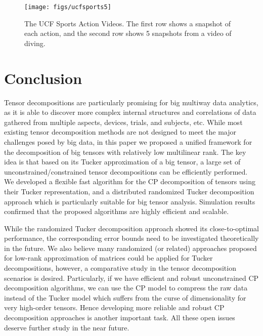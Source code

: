 \documentclass[10pt,twocolumn,twoside]{IEEEtran}
\begin{document}
 \begin{figure}[!t]
\centerline{
    \texttt{[image: figs/ucfsports5]}
}
\caption{The UCF Sports Action Videos. The first row shows a snapshot of each action, and the second row shows 5 snapshots from a video of diving.}
\label{fig:UCFSports}
\end{figure}


\section{Conclusion}
\label{sec:conclusion}
Tensor decompositions are particularly promising for big multiway data analytics, as it is able to discover more complex internal structures and correlations of data gathered from multiple aspects, devices, trials, and subjects, etc. While most existing tensor decomposition methods are not designed to meet the major challenges posed by big data, in this paper we proposed a unified framework for the decomposition of big tensors with relatively low multilinear rank. The key idea is that based on its Tucker approximation of a big tensor, a large set of unconstrained/constrained tensor decompositions can be efficiently performed. We developed a flexible fast algorithm for the CP decomposition of tensors using their Tucker representation, and a distributed randomized Tucker decomposition approach which is particularly suitable for big tensor analysis. Simulation results confirmed that the proposed algorithms are highly efficient and scalable. 

While the randomized Tucker decomposition approach showed its close-to-optimal performance, the corresponding error bounds need to be investigated theoretically in the future. We also believe many randomized (or related) approaches proposed for low-rank approximation of matrices \cite{siam_probLowRank,LRApIEEE} could be applied for Tucker decompositions, however, a comparative study in the tensor decomposition scenarios is desired. Particularly, if we have efficient and robust unconstrained CP decomposition algorithms, we can use the CP model to compress the raw data instead of the Tucker model which suffers from the curse of dimensionality for very high-order tensors. Hence developing more reliable and robust CP decomposition approaches is another important task. All these open issues deserve further study in the near future.





\end{document}

